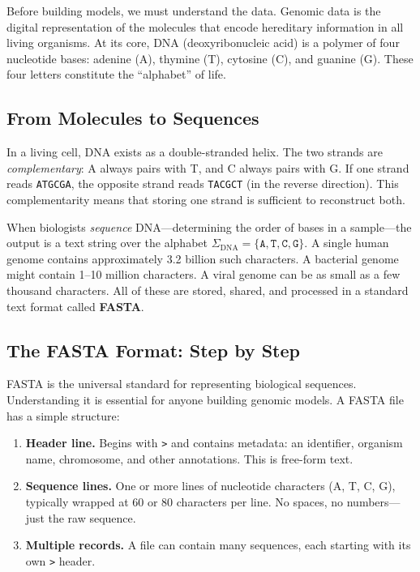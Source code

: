 Before building models, we must understand the data. Genomic data is the digital representation of the molecules that encode hereditary information in all living organisms. At its core, DNA (deoxyribonucleic acid) is a polymer of four nucleotide bases: adenine (A), thymine (T), cytosine (C), and guanine (G). These four letters constitute the ``alphabet'' of life.

\subsection{From Molecules to Sequences}

In a living cell, DNA exists as a double-stranded helix. The two strands are \emph{complementary}: A always pairs with T, and C always pairs with G. If one strand reads \texttt{ATGCGA}, the opposite strand reads \texttt{TACGCT} (in the reverse direction). This complementarity means that storing one strand is sufficient to reconstruct both.

When biologists \emph{sequence} DNA---determining the order of bases in a sample---the output is a text string over the alphabet $\Sigma_{\mathrm{DNA}} = \{\texttt{A}, \texttt{T}, \texttt{C}, \texttt{G}\}$. A single human genome contains approximately 3.2 billion such characters. A bacterial genome might contain 1--10 million characters. A viral genome can be as small as a few thousand characters. All of these are stored, shared, and processed in a standard text format called \textbf{FASTA}.

\subsection{The FASTA Format: Step by Step}
\label{sec:fasta-format}

FASTA is the universal standard for representing biological sequences. Understanding it is essential for anyone building genomic models. A FASTA file has a simple structure:

\begin{enumerate}[leftmargin=1.8em]
  \item \textbf{Header line.} Begins with \texttt{>} and contains metadata: an identifier, organism name, chromosome, and other annotations. This is free-form text.
  \item \textbf{Sequence lines.} One or more lines of nucleotide characters (A, T, C, G), typically wrapped at 60 or 80 characters per line. No spaces, no numbers---just the raw sequence.
  \item \textbf{Multiple records.} A file can contain many sequences, each starting with its own \texttt{>} header.
\end{enumerate}

